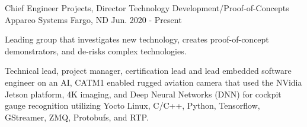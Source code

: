 

\begin{cventries}

  \cventry
    {Chief Engineer Projects, Director Technology Development/Proof-of-Concepts} %
    {Appareo Systems} %
    {Fargo, ND} %
    {Jun. 2020 - Present} %
    {
      \begin{cvitems} %
        \item {Leading group that investigates new technology, creates proof-of-concept demonstrators, and de-risks complex technologies.}
        \item {Technical lead, project manager, certification lead and lead embedded software engineer on an AI, CATM1 enabled rugged aviation camera that used the NVidia Jetson platform, 4K imaging, and Deep Neural Networks (DNN) for cockpit gauge recognition utilizing Yocto Linux, C/C++, Python, Tensorflow, GStreamer, ZMQ, Protobufs, and RTP.}
      \end{cvitems}
    }



\end{cventries}
